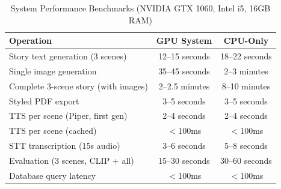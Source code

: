 \begin{table}[H]
\centering
\caption{System Performance Benchmarks (NVIDIA GTX 1060, Intel i5, 16GB RAM)}
\begin{tabular}{|l|c|c|}
\hline
\textbf{Operation} & \textbf{GPU System} & \textbf{CPU-Only} \\ \hline
Story text generation (3 scenes) & 12--15 seconds & 18--22 seconds \\ \hline
Single image generation & 35--45 seconds & 2--3 minutes \\ \hline
Complete 3-scene story (with images) & 2--2.5 minutes & 8--10 minutes \\ \hline
Styled PDF export & 3--5 seconds & 3--5 seconds \\ \hline
TTS per scene (Piper, first gen) & 2--4 seconds & 2--4 seconds \\ \hline
TTS per scene (cached) & $<$100ms & $<$100ms \\ \hline
STT transcription (15s audio) & 3--6 seconds & 5--8 seconds \\ \hline
Evaluation (3 scenes, CLIP + all) & 15--30 seconds & 30--60 seconds \\ \hline
Database query latency & $<$100ms & $<$100ms \\ \hline
\end{tabular}
\label{tab:performance}
\end{table}
